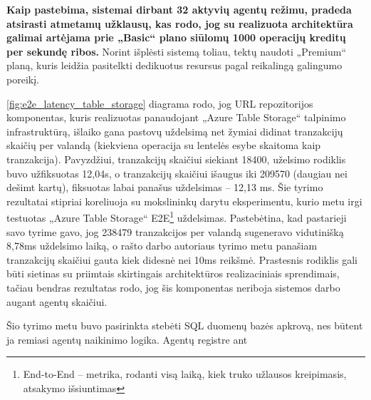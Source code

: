 \textbf{Kaip pastebima, sistemai dirbant 32 aktyvių agentų režimu, pradeda atsirasti atmetamų užklausų, kas rodo, jog su realizuota architektūra galimai artėjama prie „Basic“ plano siūlomų 1000 operacijų kreditų per sekundę ribos.} Norint išplėsti sistemą toliau, tektų naudoti „Premium“ planą, kuris leidžia pasitelkti dedikuotus resursus pagal reikalingą galingumo poreikį.

\pagebreak


\ref{fig:e2e_latency_table_storage} diagrama rodo, jog URL repozitorijos komponentas, kuris realizuotas panaudojant „Azure Table Storage“ talpinimo infrastruktūrą, išlaiko gana pastovų uždelsimą net žymiai didinat tranzakcijų skaičių per valandą (kiekviena operacija su lentelės esybe skaitoma kaip tranzakcija). Pavyzdžiui, tranzakcijų skaičiui siekiant 18400, uželsimo rodiklis buvo užfiksuotas 12,04s, o tranzakcijų skaičiui išaugus iki 209570 (daugiau nei dešimt kartų), fiksuotas labai panašus uždelsimas -- 12,13 ms. Šie tyrimo rezultatai stipriai koreliuoja su \cite{MercedCloudBasedWebCrawler} mokslininkų darytu eksperimentu, kurio metu irgi testuotas „Azure Table Storage“ E2E\footnote{End-to-End -- metrika, rodanti visą laiką, kiek truko užlausos kreipimasis, atsakymo išsiuntimas} uždelsimas. Pastebėtina, kad pastarieji savo tyrime gavo, jog 238479 tranzakcijos per valandą sugeneravo vidutinišką 8,78ms uždelsimo laiką, o rašto darbo autoriaus tyrimo metu panašiam tranzakcijų skaičiui gauta kiek didesnė nei 10ms reikšmė. Prastesnis rodiklis gali būti sietinas su priimtais skirtingais architektūros realizaciniais sprendimais, tačiau bendras rezultatas rodo, jog šis komponentas neriboja sistemos darbo augant agentų skaičiui.



Šio tyrimo metu buvo pasirinkta stebėti SQL duomenų bazės apkrovą, nes būtent ja remiasi agentų naikinimo logika. Agentų registre ant 


